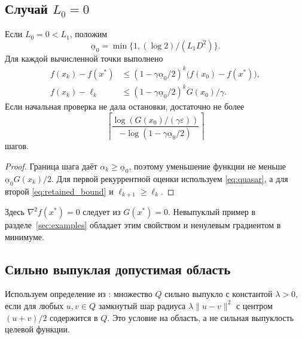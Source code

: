 \subsection{Случай \texorpdfstring{$L_0=0$}{L0=0}}
\begin{corollary}\label{cor:pure_gap_linear}
Если $L_0=0<L_1$, положим
\[
 \underline\alpha_0=\min\{1,(\log 2)/(L_1D^2)\}.
\]
Для каждой вычисленной точки выполнено
\begin{align*}
 f(x_k)-f(x^*)&\le
 (1-\gamma\underline\alpha_0/2)^k\bigl(f(x_0)-f(x^*)\bigr),\\
 f(x_k)-\ell_k&\le
 (1-\gamma\underline\alpha_0/2)^k G(x_0)/\gamma.
\end{align*}
Если начальная проверка не дала остановки, достаточно не более
\[
 \left\lceil\frac{\log(G(x_0)/(\gamma\varepsilon))}
 {-\log(1-\gamma\underline\alpha_0/2)}\right\rceil
\]
шагов.
\end{corollary}
\begin{proof}
Граница шага даёт $\alpha_k\ge\underline\alpha_0$, поэтому
уменьшение функции не меньше $\underline\alpha_0G(x_k)/2$.
Для первой рекуррентной оценки используем \eqref{eq:quasar},
а для второй \eqref{eq:retained_bound} и $\ell_{k+1}\ge\ell_k$.
\end{proof}
Здесь $\nabla^2f(x^*)=0$ следует из $G(x^*)=0$.
Невыпуклый пример в разделе~\ref{sec:examples} обладает этим свойством
и ненулевым градиентом в минимуме.

\subsection{Сильно выпуклая допустимая область}
Используем определение из \cite{vyguzov}: множество $Q$ сильно
выпукло с константой $\lambda>0$, если для любых $u,v\in Q$
замкнутый шар радиуса $\lambda\|u-v\|^2$ с центром $(u+v)/2$
содержится в $Q$. Это условие на область, а не сильная выпуклость
целевой функции.

